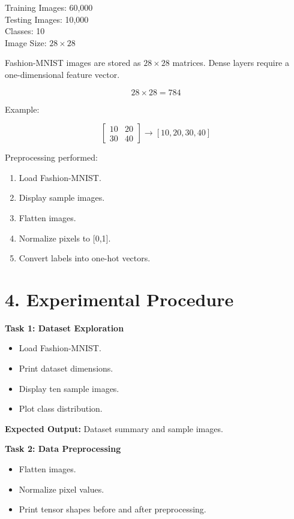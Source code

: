 \documentclass[11pt]{article}
\begin{document}
Training Images: 60,000 \\
Testing Images: 10,000 \\
Classes: 10 \\
Image Size: $28\times28$

Fashion-MNIST images are stored as $28\times28$ matrices. Dense layers require a one-dimensional feature vector.

\[
28\times28=784
\]

Example:

\[
\begin{bmatrix}
10&20\\30&40
\end{bmatrix}
\rightarrow
[10,20,30,40]
\]

Preprocessing performed:

\begin{enumerate}
\item Load Fashion-MNIST.
\item Display sample images.
\item Flatten images.
\item Normalize pixels to [0,1].
\item Convert labels into one-hot vectors.
\end{enumerate}

\section*{4. Experimental Procedure}

\textbf{Task 1: Dataset Exploration}
\begin{itemize}
\item Load Fashion-MNIST.
\item Print dataset dimensions.
\item Display ten sample images.
\item Plot class distribution.
\end{itemize}

\textbf{Expected Output:}
Dataset summary and sample images.

\bigskip

\textbf{Task 2: Data Preprocessing}

\begin{itemize}
\item Flatten images.
\item Normalize pixel values.
\item Print tensor shapes before and after preprocessing.
\end{itemize}
\end{document}
